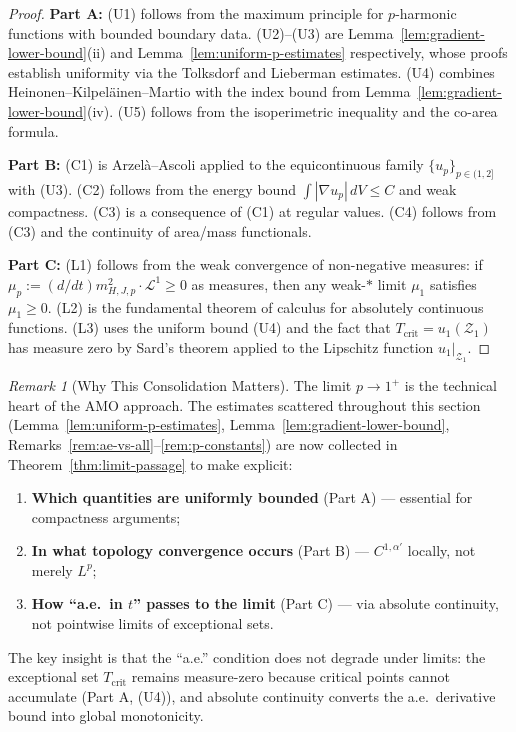 \documentclass[12pt]{article}
\theoremstyle{plain}
\theoremstyle{definition}
\theoremstyle{remark}
\newtheorem{remark}[theorem]{Remark}
\begin{document}
\begin{proof}
\textbf{Part A:} (U1) follows from the maximum principle for $p$-harmonic functions with bounded boundary data. (U2)--(U3) are Lemma~\ref{lem:gradient-lower-bound}(ii) and Lemma~\ref{lem:uniform-p-estimates} respectively, whose proofs establish uniformity via the Tolksdorf and Lieberman estimates. (U4) combines Heinonen--Kilpel\"ainen--Martio \cite[Theorem 7.46]{heinonen1993} with the index bound from Lemma~\ref{lem:gradient-lower-bound}(iv). (U5) follows from the isoperimetric inequality and the co-area formula.

\textbf{Part B:} (C1) is Arzel\`a--Ascoli applied to the equicontinuous family $\{u_p\}_{p \in (1,2]}$ with (U3). (C2) follows from the energy bound $\int |\nabla u_p| \, dV \leq C$ and weak compactness. (C3) is a consequence of (C1) at regular values. (C4) follows from (C3) and the continuity of area/mass functionals.

\textbf{Part C:} (L1) follows from the weak convergence of non-negative measures: if $\mu_p := (d/dt)m_{H,J,p}^2 \cdot \mathcal{L}^1 \geq 0$ as measures, then any weak-$*$ limit $\mu_1$ satisfies $\mu_1 \geq 0$. (L2) is the fundamental theorem of calculus for absolutely continuous functions. (L3) uses the uniform bound (U4) and the fact that $T_{\mathrm{crit}} = u_1(\mathcal{Z}_1)$ has measure zero by Sard's theorem applied to the Lipschitz function $u_1|_{\mathcal{Z}_1}$.
\end{proof}

\begin{remark}[Why This Consolidation Matters]\label{rem:consolidation}
The limit $p \to 1^+$ is the technical heart of the AMO approach. The estimates scattered throughout this section (Lemma~\ref{lem:uniform-p-estimates}, Lemma~\ref{lem:gradient-lower-bound}, Remarks~\ref{rem:ae-vs-all}--\ref{rem:p-constants}) are now collected in Theorem~\ref{thm:limit-passage} to make explicit:
\begin{enumerate}
    \item \textbf{Which quantities are uniformly bounded} (Part A) --- essential for compactness arguments;
    \item \textbf{In what topology convergence occurs} (Part B) --- $C^{1,\alpha'}$ locally, not merely $L^p$;
    \item \textbf{How ``a.e.\ in $t$'' passes to the limit} (Part C) --- via absolute continuity, not pointwise limits of exceptional sets.
\end{enumerate}
The key insight is that the ``a.e.'' condition does not degrade under limits: the exceptional set $T_{\mathrm{crit}}$ remains measure-zero because critical points cannot accumulate (Part A, (U4)), and absolute continuity converts the a.e.\ derivative bound into global monotonicity.
\end{remark}
\end{document}
